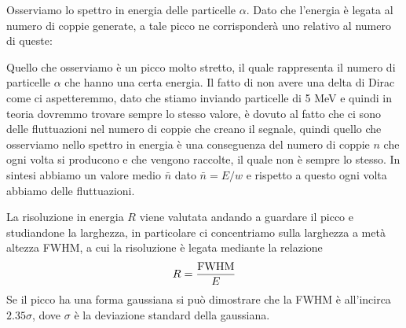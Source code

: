 Osserviamo lo spettro in energia delle particelle $\alpha$. Dato che l'energia è legata al numero di coppie generate, a tale picco ne corrisponderà uno relativo al numero di queste:

\vspace{-0.2cm}

\begin{figure}[H]
   \centering
\end{figure}

\vspace{-0.4cm}Quello che osserviamo è un picco molto stretto, il quale rappresenta il numero di particelle $\alpha$ che hanno una certa energia. Il fatto di non avere una delta di Dirac come ci aspetteremmo, dato che stiamo inviando particelle di 5 MeV e quindi in teoria dovremmo trovare sempre lo stesso valore, è dovuto al fatto che ci sono delle fluttuazioni nel numero di coppie che creano il segnale, quindi quello che osserviamo nello spettro in energia è una conseguenza del numero di coppie $n$ che ogni volta si producono e che vengono raccolte, il quale non è sempre lo stesso. In sintesi abbiamo un valore medio $\bar{n}$ dato $\bar{n}=E/w$ e rispetto a questo ogni volta abbiamo delle fluttuazioni.

La risoluzione in energia $R$ viene valutata andando a guardare il picco e studiandone la larghezza, in particolare ci concentriamo sulla larghezza a metà altezza FWHM, a cui la risoluzione è legata mediante la relazione
\begin{equation*}
   R=\frac{\rm FWHM}{E}
\end{equation*}
Se il picco ha una forma gaussiana si può dimostrare che la FWHM è all'incirca $2.35 \sigma$, dove $\sigma$ è la deviazione standard della gaussiana.

